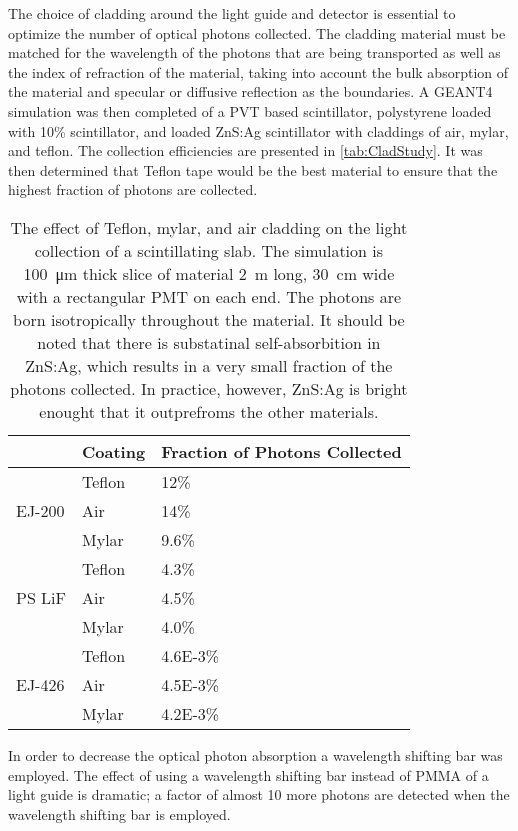 The choice of cladding around the light guide and detector is essential to optimize the number of optical photons collected.
The cladding material must be matched for the wavelength of the photons that are being transported as well as the index of refraction of the material, taking into account the bulk absorption of the material and specular or diffusive reflection as the boundaries.
A GEANT4 simulation was then completed of a PVT based scintillator, polystyrene loaded with 10\%  scintillator, and  loaded ZnS:Ag scintillator with claddings of air, mylar, and teflon.
The collection efficiencies are presented in \autoref{tab:CladStudy}.
It was then determined that Teflon tape would be the best material to ensure that the highest fraction of photons are collected.
\begin{table}
  \caption[Teflon, Mylar, and HDPE Cladding Light Collection Effect]{The effect of Teflon, mylar, and air cladding on the light collection of a scintillating slab. The simulation is \SI{100}{\um} thick slice of material \SI{2}{\m} long, \SI{30}{\cm} wide with a rectangular PMT on each end. The photons are born isotropically throughout the material. It should be noted that there is substatinal self-absorbition in ZnS:Ag, which results in a very small fraction of the photons collected. In practice, however, ZnS:Ag is bright enought that it outprefroms the other materials.}
  \label{tab:CladStudy}
  \begin{tabular}{p{4cm} m{3cm} m{3cm}}
  \toprule
  & Coating & Fraction of Photons Collected \\
  \midrule 
  \multirow{3}{*}{EJ-200} & Teflon & 12\% \\
  				      & Air &  14\% \\
				      & Mylar & 9.6\% \\
  \midrule 
  \multirow{3}{*}{PS LiF} & Teflon & 4.3\% \\
  				      & Air & 4.5\% \\
				      & Mylar & 4.0\% \\
  \midrule 
  \multirow{3}{*}{EJ-426} & Teflon & \num{4.6E-3}\% \\
  				      & Air & \num{4.5E-3}\% \\
				      & Mylar & \num{4.2E-3}\% \\
 \bottomrule				 	   				  
 \end{tabular}
\end{table}
In order to decrease the optical photon absorption a wavelength shifting bar was employed.
The effect of using a wavelength shifting bar instead of PMMA of a light guide is dramatic; a factor of almost 10 more photons are detected when the wavelength shifting bar is employed.
